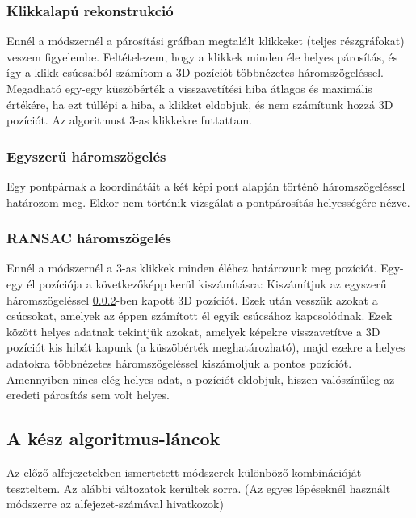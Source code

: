 \documentclass{article}
\begin{document}
	\subsubsection{Klikkalapú rekonstrukció}
	\label{clique_pos_simple}
	Ennél a módszernél a párosítási gráfban megtalált klikkeket (teljes részgráfokat) veszem figyelembe. Feltételezem, hogy a klikkek minden éle helyes párosítás, és így a klikk csúcsaiból számítom a 3D pozíciót többnézetes háromszögeléssel. Megadható egy-egy küszöbérték a visszavetítési hiba átlagos és maximális értékére, ha ezt túllépi a hiba, a klikket eldobjuk, és nem számítunk hozzá 3D pozíciót. Az algoritmust 3-as klikkekre futtattam.
	
	\subsubsection{Egyszerű háromszögelés}
	\label{triang_simple}	
	Egy pontpárnak a koordinátáit a két képi pont alapján történő háromszögeléssel határozom meg. Ekkor nem történik vizsgálat a pontpárosítás helyességére nézve.
	
	\subsubsection{RANSAC háromszögelés}
	\label{triang}
	Ennél a módszernél a 3-as klikkek minden éléhez határozunk meg pozíciót. Egy-egy él pozíciója a következőképp kerül kiszámításra: Kiszámítjuk az egyszerű háromszögeléssel \ref{triang_simple}-ben kapott 3D pozíciót. Ezek után vesszük azokat a csúcsokat, amelyek az éppen számított él egyik csúcsához kapcsolódnak. Ezek között helyes adatnak tekintjük azokat, amelyek képekre visszavetítve a 3D pozíciót kis hibát kapunk (a küszöbérték meghatározható), majd ezekre a helyes adatokra többnézetes háromszögeléssel kiszámoljuk a pontos pozíciót. Amennyiben nincs elég helyes adat, a pozíciót eldobjuk, hiszen valószínűleg az eredeti párosítás sem volt helyes.
	
	\newpage
	\subsection{A kész algoritmus-láncok}	
	Az előző alfejezetekben ismertetett módszerek különböző kombinációját teszteltem. Az alábbi változatok kerültek sorra. (Az egyes lépéseknél használt módszerre az alfejezet-számával hivatkozok)
	
\end{document}
